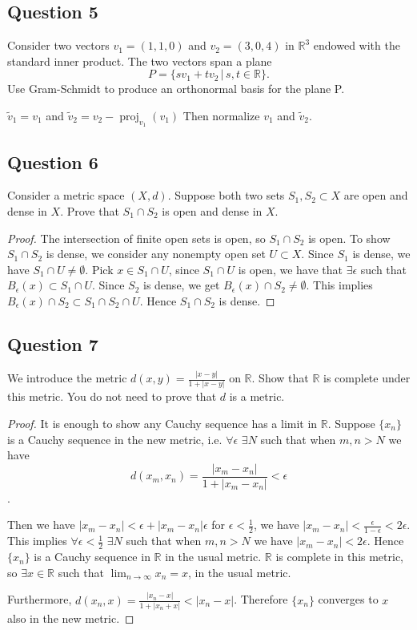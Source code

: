 \documentclass{tufte-book}
\DeclareMathOperator{\proj}{proj}
\theoremstyle{mytheoremstyle}
\theoremstyle{mylemstyle}
\theoremstyle{mydefstyle}
\begin{document}
\subsection{Question 5}
Consider two vectors $v_1=(1,1,0)$ and $v_2=(3,0,4)$ in $\mathbb{R}^3$ endowed with the standard inner product.  The two vectors span a plane
\[ P = \{sv_1 + tv_2 \,|\, s,t \in \mathbb{R} \}. \]
Use Gram-Schmidt to produce an orthonormal basis for the plane P.

$\tilde{v}_1 = v_1$ and $\tilde{v}_2 = v_2 - \proj_{v_1}(v_1)$
Then normalize $v_1$ and $\tilde{v}_2$.
\subsection{Question 6}
Consider a metric space $(X,d)$.  Suppose both two sets $S_1, S_2 \subset X$ are open and dense in $X$.  Prove that $S_1 \cap S_2$ is open and dense in $X$.

\begin{proof}
The intersection of finite open sets is open, so $S_1 \cap S_2$ is open.  To show $S_1 \cap S_2$ is dense, we consider any nonempty open set $U \subset X$.  Since $S_1$ is dense, we have $S_1 \cap U \neq \emptyset$.  Pick $x \in S_1 \cap U$, since $S_1 \cap U$ is open, we have that $\exists \epsilon$ such that $B_\epsilon(x) \subset S_1 \cap U$.  Since $S_2$ is dense, we get $B_\epsilon(x) \cap S_2 \neq \emptyset$.  This implies $B_\epsilon(x) \cap S_2 \subset S_1 \cap S_2 \cap U$.  Hence $S_1 \cap S_2$ is dense.
\end{proof}

\subsection{Question 7}
We introduce the metric $d(x,y) = \frac{|x-y|}{1+ |x-y|}$ on $\mathbb{R}$.  Show that $\mathbb{R}$ is complete under this metric.  You do not need to prove that $d$ is a metric.

\begin{proof}

It is enough to show any Cauchy sequence has a limit in $\mathbb{R}$.  Suppose $\{x_n\}$ is a Cauchy sequence in the new metric, i.e. $\forall \epsilon$ $\exists N$ such that when $m,n > N$ we have
\[ d(x_m, x_n) = \frac{|x_m - x_n|}{1+|x_m-x_n|} < \epsilon \].

Then we have $|x_m - x_n| < \epsilon + |x_m-x_n|\epsilon$ for $\epsilon < \frac{1}{2}$, we have $|x_m-x_n| < \frac{\epsilon}{1-\epsilon} < 2\epsilon$.   This implies $\forall \epsilon < \frac{1}{2}$ $\exists N$ such that when $m, n > N$ we have $|x_m - x_n| < 2\epsilon$.  Hence $\{x_n\}$ is a Cauchy sequence in $\mathbb{R}$ in the usual metric. $\mathbb{R}$ is complete in this metric, so $\exists x \in \mathbb{R}$ such that $\lim_{n \to \infty}x_n = x$, in the usual metric.

Furthermore, $d(x_n, x) = \frac{|x_n -x|}{1+|x_n+x|} < |x_n-x|$.  Therefore $\{x_n\}$ converges to $x$ also in the new metric.

\end{proof}
\end{document}

